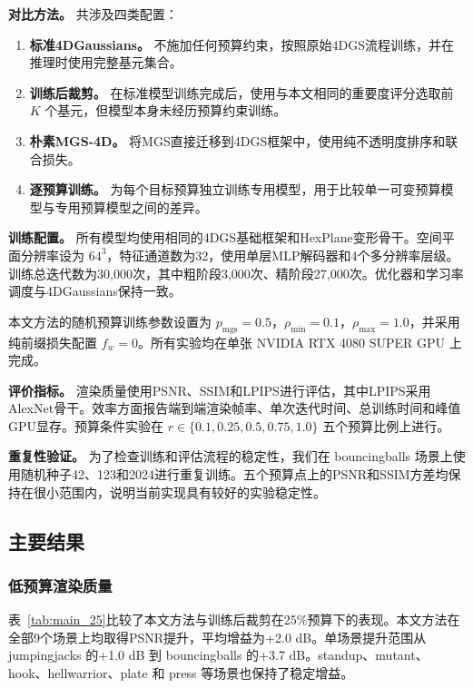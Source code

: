 \documentclass[sn-mathphys]{sn-jnl}
\begin{document}
\textbf{对比方法。}
共涉及四类配置：

\begin{enumerate}
    \item \textbf{标准4DGaussians。} 不施加任何预算约束，按照原始4DGS流程训练，并在推理时使用完整基元集合。
    \item \textbf{训练后裁剪。} 在标准模型训练完成后，使用与本文相同的重要度评分选取前 $K$ 个基元，但模型本身未经历预算约束训练。
    \item \textbf{朴素MGS-4D。} 将MGS直接迁移到4DGS框架中，使用纯不透明度排序和联合损失。
    \item \textbf{逐预算训练。} 为每个目标预算独立训练专用模型，用于比较单一可变预算模型与专用预算模型之间的差异。
\end{enumerate}

\textbf{训练配置。}
所有模型均使用相同的4DGS基础框架和HexPlane变形骨干。空间平面分辨率设为 $64^3$，特征通道数为32，使用单层MLP解码器和4个多分辨率层级。训练总迭代数为30,000次，其中粗阶段3,000次、精阶段27,000次。优化器和学习率调度与4DGaussians保持一致。

本文方法的随机预算训练参数设置为 $p_{\mathrm{mgs}}=0.5$，$\rho_{\min}=0.1$，$\rho_{\max}=1.0$，并采用纯前缀损失配置 $f_w=0$。所有实验均在单张 NVIDIA RTX 4080 SUPER GPU 上完成。

\textbf{评价指标。}
渲染质量使用PSNR、SSIM和LPIPS进行评估，其中LPIPS采用AlexNet骨干。效率方面报告端到端渲染帧率、单次迭代时间、总训练时间和峰值GPU显存。预算条件实验在 $r \in \{0.1,0.25,0.5,0.75,1.0\}$ 五个预算比例上进行。

\textbf{重复性验证。}
为了检查训练和评估流程的稳定性，我们在 bouncingballs 场景上使用随机种子42、123和2024进行重复训练。五个预算点上的PSNR和SSIM方差均保持在很小范围内，说明当前实现具有较好的实验稳定性。

\subsection{主要结果}
\label{sec:main}

\subsubsection{低预算渲染质量}

表~\ref{tab:main_25}比较了本文方法与训练后裁剪在25\%预算下的表现。本文方法在全部9个场景上均取得PSNR提升，平均增益为+2.0 dB。单场景提升范围从 jumpingjacks 的+1.0 dB 到 bouncingballs 的+3.7 dB。standup、mutant、hook、hellwarrior、plate 和 press 等场景也保持了稳定增益。
\end{document}
